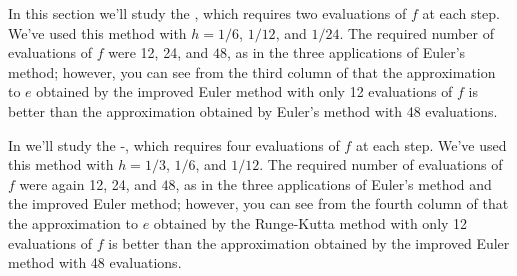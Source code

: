 In this section we'll study the
, which
requires two evaluations of $f$ at each step. We've used this method
with $h=1/6$, $1/12$, and $1/24$. The required number of evaluations
of $f$ were 12, 24, and $48$, as in the three applications of Euler's
method;     however, you can see from the third column of
 that the approximation to $e$ obtained by the
improved Euler method with only 12 evaluations of $f$ is better than
the approximation obtained by Euler's method with 48 evaluations.

In  we'll study the
-,
which requires four evaluations of $f$ at each step. We've used this
method with $h=1/3$, $1/6$, and $1/12$. The required number of
evaluations of $f$ were again 12, 24, and $48$, as in the three
applications of Euler's method and the improved Euler method;     however,
you can see from the fourth column of  that the
approximation to $e$ obtained by the Runge-Kutta method with only 12
evaluations of $f$ is better than the approximation obtained by the
improved Euler method with 48 evaluations.



